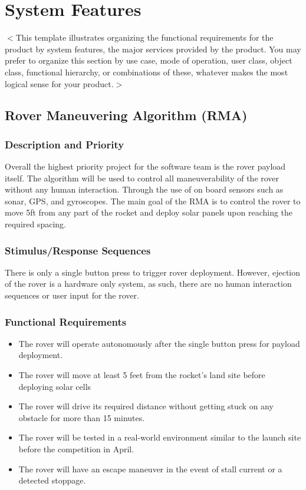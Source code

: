 \documentclass{scrreprt}
\begin{document}
\chapter{System Features}
$<$This template illustrates organizing the functional requirements for the 
product by system features, the major services provided by the product. You may 
prefer to organize this section by use case, mode of operation, user class, 
object class, functional hierarchy, or combinations of these, whatever makes the 
most logical sense for your product.$>$


\section{Rover Maneuvering Algorithm (RMA)}
\subsection{Description and Priority}
Overall the highest priority project for the software team is the rover payload itself.
The algorithm will be used to control all maneuverability of the rover without any human interaction. 
Through the use of on board sensors such as sonar, GPS, and gyroscopes.
The main goal of the RMA is to control the rover to move 5ft from any part of the rocket and deploy solar panels upon reaching the required spacing.

\subsection{Stimulus/Response Sequences}
There is only a single button press to trigger rover deployment. However, ejection of the rover is a hardware only system, as such, there are no human interaction sequences or user input for the rover.

\subsection{Functional Requirements}
\begin{itemize}
\item The rover will operate autonomously after the single button press for payload deployment.
\item The rover will move at least 5 feet from the rocket's land site before deploying solar cells
\item The rover will drive its required distance without getting stuck on any obstacle for more than 15 minutes.
\item The rover will be tested in a real-world environment similar to the launch site before the competition in April.
\item The rover will have an escape maneuver in the event of stall current or a detected stoppage.
\end{itemize}
\end{document}
